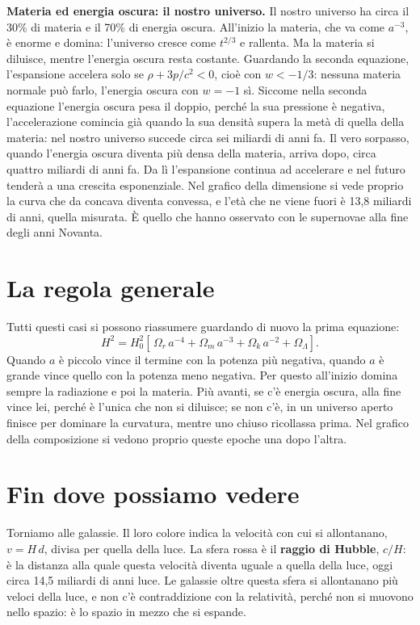 \documentclass[12pt,a4paper]{article}
\begin{document}
\textbf{Materia ed energia oscura: il nostro universo.} Il nostro universo ha circa il 30\% di materia e il 70\% di energia oscura. All'inizio la materia, che va come $a^{-3}$, è enorme e domina: l'universo cresce come $t^{2/3}$ e rallenta. Ma la materia si diluisce, mentre l'energia oscura resta costante. Guardando la seconda equazione, l'espansione accelera solo se $\rho + 3p/c^2 < 0$, cioè con $w < -1/3$: nessuna materia normale può farlo, l'energia oscura con $w = -1$ sì. Siccome nella seconda equazione l'energia oscura pesa il doppio, perché la sua pressione è negativa, l'accelerazione comincia già quando la sua densità supera la metà di quella della materia: nel nostro universo succede circa sei miliardi di anni fa. Il vero sorpasso, quando l'energia oscura diventa più densa della materia, arriva dopo, circa quattro miliardi di anni fa. Da lì l'espansione continua ad accelerare e nel futuro tenderà a una crescita esponenziale. Nel grafico della dimensione si vede proprio la curva che da concava diventa convessa, e l'età che ne viene fuori è 13,8 miliardi di anni, quella misurata. È quello che hanno osservato con le supernovae alla fine degli anni Novanta.

\section{La regola generale}
Tutti questi casi si possono riassumere guardando di nuovo la prima equazione:
\[ H^2 = H_0^2 \left[\,\Omega_r\, a^{-4} + \Omega_m\, a^{-3} + \Omega_k\, a^{-2} + \Omega_\Lambda \right]. \]
Quando $a$ è piccolo vince il termine con la potenza più negativa, quando $a$ è grande vince quello con la potenza meno negativa. Per questo all'inizio domina sempre la radiazione e poi la materia. Più avanti, se c'è energia oscura, alla fine vince lei, perché è l'unica che non si diluisce; se non c'è, in un universo aperto finisce per dominare la curvatura, mentre uno chiuso ricollassa prima. Nel grafico della composizione si vedono proprio queste epoche una dopo l'altra.

\section{Fin dove possiamo vedere}
Torniamo alle galassie. Il loro colore indica la velocità con cui si allontanano, $v = H\,d$, divisa per quella della luce. La sfera rossa è il \textbf{raggio di Hubble}, $c/H$: è la distanza alla quale questa velocità diventa uguale a quella della luce, oggi circa 14,5 miliardi di anni luce. Le galassie oltre questa sfera si allontanano più veloci della luce, e non c'è contraddizione con la relatività, perché non si muovono nello spazio: è lo spazio in mezzo che si espande.
\end{document}
